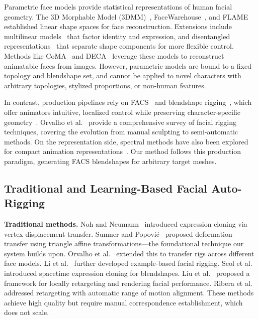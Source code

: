 \documentclass[acmtog,anonymous,review]{acmart}
\begin{document}
Parametric face models provide statistical representations of human facial geometry. The 3D Morphable Model (3DMM)~\cite{blanz1999morphable}, FaceWarehouse~\cite{cao2014facewarehouse}, and FLAME~\cite{li2017learning} established linear shape spaces for face reconstruction. Extensions include multilinear models~\cite{brunton2014multilinear, vlasic2006face} that factor identity and expression, and disentangled representations~\cite{abrevaya2019decoupled, jiang2019disentangled} that separate shape components for more flexible control. Methods like CoMA~\cite{ranjan2018generating} and DECA~\cite{feng2021learning} leverage these models to reconstruct animatable faces from images. However, parametric models are bound to a fixed topology and blendshape set, and cannot be applied to novel characters with arbitrary topologies, stylized proportions, or non-human features.

In contrast, production pipelines rely on FACS~\cite{ekman1978facial} and blendshape rigging~\cite{lewis2014practice, lewis2010direct}, which offer animators intuitive, localized control while preserving character-specific geometry~\cite{seol2011artist, kavan2024compressed}. Orvalho et al.~\cite{orvalho2012facial} provide a comprehensive survey of facial rigging techniques, covering the evolution from manual sculpting to semi-automatic methods. On the representation side, spectral methods have also been explored for compact animation representations~\cite{wang2015spectral}. Our method follows this production paradigm, generating FACS blendshapes for arbitrary target meshes.

\subsection{Traditional and Learning-Based Facial Auto-Rigging}

\textbf{Traditional methods.} Noh and Neumann~\cite{noh2001expression} introduced expression cloning via vertex displacement transfer. Sumner and Popovi\'{c}~\cite{sumner2004deformation} proposed deformation transfer using triangle affine transformations---the foundational technique our system builds upon. Orvalho et al.~\cite{orvalho2008transferring} extended this to transfer rigs across different face models. Li et al.~\cite{li2010example} further developed example-based facial rigging. Seol et al.~\cite{seol2012spacetime} introduced spacetime expression cloning for blendshapes. Liu et al.~\cite{liu2011framework} proposed a framework for locally retargeting and rendering facial performance. Ribera et al.~\cite{ribera2017facial} addressed retargeting with automatic range of motion alignment. These methods achieve high quality but require manual correspondence establishment, which does not scale.
\end{document}
